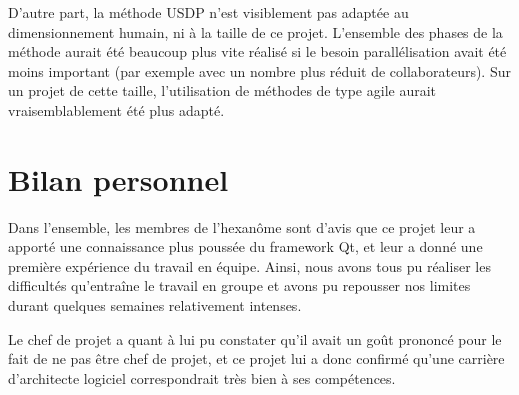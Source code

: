 D'autre part, la méthode USDP n'est visiblement pas adaptée au dimensionnement humain, ni à la taille de ce projet. L'ensemble des phases de la méthode aurait été beaucoup plus vite réalisé si le besoin parallélisation avait été moins important (par exemple avec un nombre plus réduit de collaborateurs). Sur un projet de cette taille, l'utilisation de méthodes de type agile aurait vraisemblablement été plus adapté.

\section{Bilan personnel}
Dans l'ensemble, les membres de l'hexanôme sont d'avis que ce projet leur a apporté une connaissance plus poussée du framework Qt, et leur a donné une première expérience du travail en équipe. Ainsi, nous avons tous pu réaliser les difficultés qu'entraîne le travail en groupe et avons pu repousser nos limites durant quelques semaines relativement intenses.

Le chef de projet a quant à lui pu constater qu'il avait un goût prononcé pour le fait de ne pas être chef de projet, et ce projet lui a donc confirmé qu'une carrière d'architecte logiciel correspondrait très bien à ses compétences.

